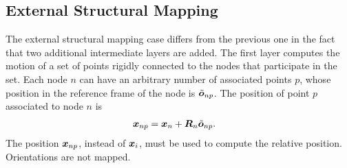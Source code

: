 \subsection{External Structural Mapping}
The external structural mapping case differs from the previous one
in the fact that two additional intermediate layers are added.
The first layer computes the motion of a set of points
rigidly connected to the nodes that participate in the set.
Each node $n$ can have an arbitrary number of associated points $p$,
whose position in the reference frame of the node is $\tilde{\bm{o}}_{np}$.
The position of point $p$ associated to node $n$ is
\begin{align}
	\bm{x}_{np}
	&=
	\bm{x}_n
	+
	\bm{R}_n \tilde{\bm{o}}_{np}
	\label{eq:forces:external-mapping:x_np}
	.
\end{align}
The position $\bm{x}_{np}$, instead of $\bm{x}_i$, must be used to compute
the relative position.
Orientations are not mapped.

